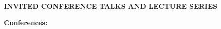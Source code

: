 \documentclass[a4paper, 12pt]{article}
\begin{document}
\par\quad\par\smallskip
\textbf{INVITED CONFERENCE TALKS AND LECTURE SERIES}\par\smallskip
\textbf{Conferences:}
\end{document}
